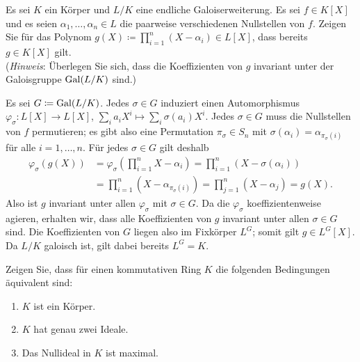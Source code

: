 \begin{question}
  Es sei $K$ ein Körper und $L/K$ eine endliche Galoiserweiterung.
  Es sei $f \in K[X]$ und es seien $\alpha_1, \dotsc, \alpha_n \in L$ die paarweise verschiedenen Nullstellen von $f$.
  Zeigen Sie für das Polynom $g(X) \coloneqq \prod_{i=1}^n (X - \alpha_i) \in L[X]$, dass bereits $g \in K[X]$ gilt.
  \\
  (\emph{Hinweis}:
   Überlegen Sie sich, dass die Koeffizienten von $g$ invariant unter der Galoisgruppe $\operatorname{Gal}(L/K)$ sind.)
\end{question}


\begin{solution}
  Es sei $G \coloneqq \operatorname{Gal}(L/K)$.
  Jedes $\sigma \in G$ induziert einen Automorphismus $\varphi_\sigma \colon L[X] \to L[X]$, $\sum_i a_i X^i \mapsto \sum_i \sigma(a_i) X^i$.
  Jedes $\sigma \in G$ muss die Nullstellen von $f$ permutieren;
  es gibt also eine Permutation $\pi_\sigma \in S_n$ mit $\sigma(\alpha_i) = \alpha_{\pi_\sigma(i)}$ für alle $i = 1, \dotsc, n$.
  Für jedes $\sigma \in G$ gilt deshalb
  \begin{align*}
        \varphi_\sigma( g(X) )
    &=  \varphi_\sigma\left( \prod_{i=1}^n X - \alpha_i \right)
     =  \prod_{i=1}^n ( X - \sigma(\alpha_i) )
    \\
    &=  \prod_{i=1}^n ( X- \alpha_{\pi_\sigma(i)} )
     =  \prod_{j=1}^n ( X - \alpha_j )
     =  g(X).
  \end{align*}
  Also ist $g$ invariant unter allen $\varphi_\sigma$ mit $\sigma \in G$.
  Da die $\varphi_\sigma$ koeffizientenweise agieren, erhalten wir, dass alle Koeffizienten von $g$ invariant unter allen $\sigma \in G$ sind.
  Die Koeffizienten von $G$ liegen also im Fixkörper $L^G$;
  somit gilt $g \in L^G[X]$.
  Da $L/K$ galoisch ist, gilt dabei bereits $L^G = K$.
\end{solution}


\begin{question}
  \label{question: characterization of fields via its ideals}
  Zeigen Sie, dass für einen kommutativen Ring $K$ die folgenden Bedingungen äquivalent sind:
  \begin{enumerate}
    \item
      \label{enum: K is a field}
      $K$ ist ein Körper.
    \item
      \label{enum: K has exactly two ideals}
      $K$ hat genau zwei Ideale.
    \item
      \label{enum: The zero ideal is maximal}
      Das Nullideal in $K$ ist maximal.
  \end{enumerate}
\end{question}


